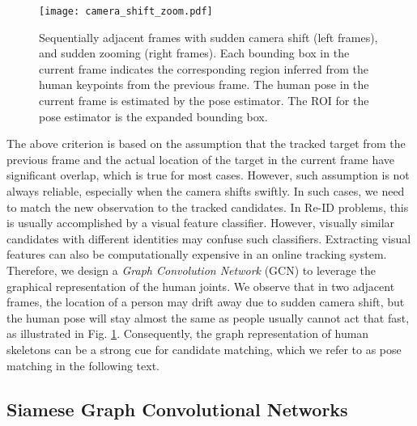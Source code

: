 \documentclass[10pt,twocolumn,letterpaper]{article}
\begin{document}
	
	\begin{figure}
		\centering
		\texttt{[image: camera\_shift\_zoom.pdf]}
		\caption{Sequentially adjacent frames with sudden camera shift (left frames), and sudden zooming (right frames). Each bounding box in the current frame indicates the corresponding region inferred from the human keypoints from the previous frame. The human pose in the current frame is estimated by the pose estimator. The ROI for the pose estimator is the expanded bounding box. } 
		\label{fig:camera_shift}
		\vspace{-.2in}
	\end{figure}
	The above criterion is based on the assumption that the tracked target from the previous frame and the actual location of the target in the current frame have significant overlap, which is true for most cases.  
	However, such assumption is not always reliable, especially when the camera shifts swiftly. 
	In such cases, we need to match the new observation to the tracked candidates. In Re-ID problems, this is usually accomplished by a visual feature classifier.
	However, visually similar candidates with different identities may confuse such classifiers. Extracting visual features can also be computationally expensive in an online tracking system. Therefore, we design a \textit{Graph Convolution Network }(GCN) to leverage the graphical representation of the human joints. We observe that in two adjacent frames, the location of a person may drift away due to sudden camera shift, but the human pose will stay almost the same as people usually cannot act that fast, as illustrated in Fig. \ref{fig:camera_shift}. Consequently, the graph representation of human skeletons can be a strong cue for candidate matching, which we refer to as pose matching in the following text. 
	
	\subsection{Siamese Graph Convolutional Networks}
	
\end{document}
